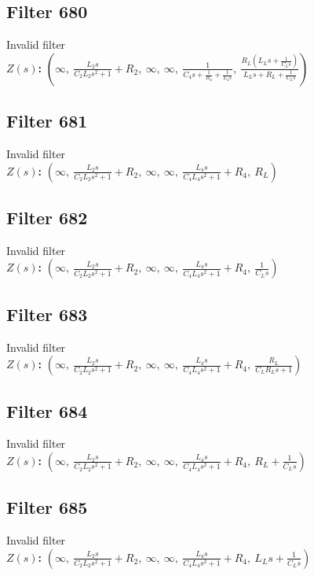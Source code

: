\documentclass{article}
\begin{document}
\subsection*{Filter 680}
Invalid filter \\ 
\textbf{$Z(s)$:} $\left( \infty, \  \frac{L_{2} s}{C_{2} L_{2} s^{2} + 1} + R_{2}, \  \infty, \  \infty, \  \frac{1}{C_{4} s + \frac{1}{R_{4}} + \frac{1}{L_{4} s}}, \  \frac{R_{L} \left(L_{L} s + \frac{1}{C_{L} s}\right)}{L_{L} s + R_{L} + \frac{1}{C_{L} s}}\right)$ \\ 
\subsection*{Filter 681}
Invalid filter \\ 
\textbf{$Z(s)$:} $\left( \infty, \  \frac{L_{2} s}{C_{2} L_{2} s^{2} + 1} + R_{2}, \  \infty, \  \infty, \  \frac{L_{4} s}{C_{4} L_{4} s^{2} + 1} + R_{4}, \  R_{L}\right)$ \\ 
\subsection*{Filter 682}
Invalid filter \\ 
\textbf{$Z(s)$:} $\left( \infty, \  \frac{L_{2} s}{C_{2} L_{2} s^{2} + 1} + R_{2}, \  \infty, \  \infty, \  \frac{L_{4} s}{C_{4} L_{4} s^{2} + 1} + R_{4}, \  \frac{1}{C_{L} s}\right)$ \\ 
\subsection*{Filter 683}
Invalid filter \\ 
\textbf{$Z(s)$:} $\left( \infty, \  \frac{L_{2} s}{C_{2} L_{2} s^{2} + 1} + R_{2}, \  \infty, \  \infty, \  \frac{L_{4} s}{C_{4} L_{4} s^{2} + 1} + R_{4}, \  \frac{R_{L}}{C_{L} R_{L} s + 1}\right)$ \\ 
\subsection*{Filter 684}
Invalid filter \\ 
\textbf{$Z(s)$:} $\left( \infty, \  \frac{L_{2} s}{C_{2} L_{2} s^{2} + 1} + R_{2}, \  \infty, \  \infty, \  \frac{L_{4} s}{C_{4} L_{4} s^{2} + 1} + R_{4}, \  R_{L} + \frac{1}{C_{L} s}\right)$ \\ 
\subsection*{Filter 685}
Invalid filter \\ 
\textbf{$Z(s)$:} $\left( \infty, \  \frac{L_{2} s}{C_{2} L_{2} s^{2} + 1} + R_{2}, \  \infty, \  \infty, \  \frac{L_{4} s}{C_{4} L_{4} s^{2} + 1} + R_{4}, \  L_{L} s + \frac{1}{C_{L} s}\right)$ \\ 
\end{document}

